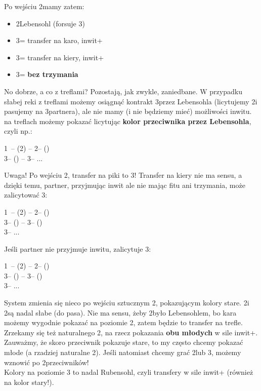 \documentclass[12pt, a4paper]{article}
\begin{document}
Po wejściu 2\spades mamy zatem:
\begin{itemize}
    \item 2\nt Lebensohl (forsuje 3\clubs)
    \item 3\clubs = transfer na karo, inwit+
    \item 3\diams = transfer na kiery, inwit+
    \item 3\nt = \gf \textbf{bez trzymania}
\end{itemize}

No dobrze, a co z treflami? Pozostają, jak zwykle,
zaniedbane. W przypadku słabej reki z treflami możemy
osiągnąć kontrakt 3\clubs przez Lebensohla (licytujemy
2\nt i pasujemy na 3\clubs partnera), ale nie mamy (i nie będziemy mieć) możliwości
inwitu. \gf na treflach możemy pokazać licytując \textbf{kolor przeciwnika przez Lebensohla}, czyli np.:

1\nt\ -- (2\spades) -- 2\nt -- (\pass)\\
3\clubs -- (\pass) -- 3\spades -- ...

Uwaga! Po wejściu 2\hearts, transfer na piki to 3\diams! Transfer na kiery nie ma sensu,
a dzięki temu, partner, przyjmując inwit ale nie mając fitu ani trzymania, może zalicytować 3\hearts:

1\nt\ -- (2\hearts) -- 2\nt -- (\pass)\\
3\clubs -- (\pass) -- 3\diams -- (\pass)\\
3\hearts -- ...

Jeśli partner nie przyjmuje inwitu, zalicytuje 3\spades:

1\nt\ -- (2\hearts) -- 2\nt -- (\pass)\\
3\clubs -- (\pass) -- 3\diams -- (\pass)\\
3\spades -- ...

System zmienia się nieco po wejściu sztucznym 2\clubs,
pokazującym kolory stare.
2\diams i 2\hearts są nadal słabe (do pasa).
Nie ma sensu, żeby 2\nt było Lebensohlem, bo kara możemy
wygodnie pokazać na poziomie 2, zatem będzie to transfer na trefle.
Zrzekamy się też naturalnego 2\spades, na rzecz
pokazania \textbf{obu młodych} w sile inwit+. 
Zauważmy, że skoro przeciwnik pokazuje stare, to
my często chcemy pokazać młode (a rzadziej naturalne 2\spades).
Jeśli natomiast chcemy grać 2\spades lub 3\clubs, 
możemy wznowić po 2\hearts przeciwników!\\
Kolory na poziomie 3 to nadal Rubensohl, czyli transfery
w sile inwit+ (również na kolor stary!).
\end{document}
